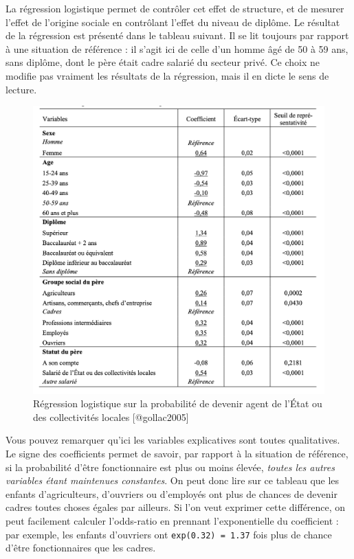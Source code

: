 \documentclass[
  french,
]{book}
\begin{document}
La régression logistique permet de contrôler cet effet de structure, et de mesurer l'effet de l'origine sociale en contrôlant l'effet du niveau de diplôme. Le résultat de la régression est présenté dans le tableau suivant. Il se lit toujours par rapport à une situation de référence : il s'agit ici de celle d'un homme âgé de 50 à 59 ans, sans diplôme, dont le père était cadre salarié du secteur privé. Ce choix ne modifie pas vraiment les résultats de la régression, mais il en dicte le sens de lecture.

\begin{figure}
\includegraphics[width=16.58in]{images/reglog} \caption{Régression logistique sur la probabilité de devenir agent de l'État ou des collectivités locales [@gollac2005]}\label{fig:unnamed-chunk-65}
\end{figure}

Vous pouvez remarquer qu'ici les variables explicatives sont toutes qualitatives. Le signe des coefficients permet de savoir, par rapport à la situation de référence, si la probabilité d'être fonctionnaire est plus ou moins élevée, \emph{toutes les autres variables étant maintenues constantes}. On peut donc lire sur ce tableau que les enfants d'agriculteurs, d'ouvriers ou d'employés ont plus de chances de devenir cadres toutes choses égales par ailleurs. Si l'on veut exprimer cette différence, on peut facilement calculer l'odds-ratio en prennant l'exponentielle du coefficient : par exemple, les enfants d'ouvriers ont \texttt{exp(0.32)\ =\ 1.37} fois plus de chance d'être fonctionnaires que les cadres.
\end{document}
